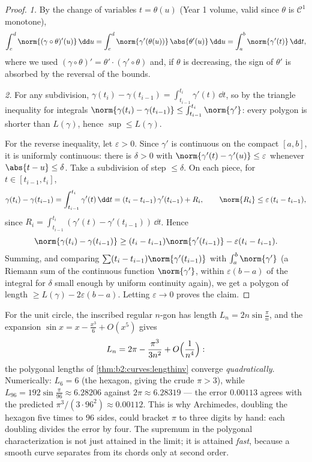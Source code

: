 \begin{proof}
\emph{1.} By the change of variables $t = \theta(u)$ (Year 1
volume, valid since $\theta$ is $\mathcal{C}^1$ monotone),
\[
\int_c^d \norm{(\gamma\circ\theta)'(u)}\,\dd u
= \int_c^d \norm{\gamma'(\theta(u))}\,\abs{\theta'(u)}\,\dd u
= \int_a^b \norm{\gamma'(t)}\,\dd t ,
\]
where we used $(\gamma\circ\theta)' = \theta'\cdot
(\gamma'\circ\theta)$ and, if $\theta$ is decreasing, the sign of
$\theta'$ is absorbed by the reversal of the bounds.

\emph{2.} For any subdivision, $\gamma(t_i) - \gamma(t_{i-1}) =
\int_{t_{i-1}}^{t_i}\gamma'(t)\,\dd t$, so by the triangle
inequality for integrals $\norm{\gamma(t_i) - \gamma(t_{i-1})}
\leq \int_{t_{i-1}}^{t_i}\norm{\gamma'}$: every polygon is shorter
than $L(\gamma)$, hence $\sup \leq L(\gamma)$.

For the reverse inequality, let $\varepsilon > 0$. Since $\gamma'$
is continuous on the compact $[a,b]$, it is uniformly continuous:
there is $\delta > 0$ with $\norm{\gamma'(t) - \gamma'(u)} \leq
\varepsilon$ whenever $\abs{t - u} \leq \delta$. Take a subdivision
of step $\leq \delta$. On each piece, for $t \in [t_{i-1}, t_i]$,
\[
\gamma(t_i) - \gamma(t_{i-1})
= \int_{t_{i-1}}^{t_i}\gamma'(t)\,\dd t
= (t_i - t_{i-1})\,\gamma'(t_{i-1}) + R_i,
\qquad
\norm{R_i} \leq \varepsilon\,(t_i - t_{i-1}),
\]
since $R_i = \int_{t_{i-1}}^{t_i}(\gamma'(t) -
\gamma'(t_{i-1}))\,\dd t$. Hence
\[
\norm{\gamma(t_i) - \gamma(t_{i-1})}
\geq (t_i - t_{i-1})\norm{\gamma'(t_{i-1})}
- \varepsilon (t_i - t_{i-1}) .
\]
Summing, and comparing $\sum (t_i -
t_{i-1})\norm{\gamma'(t_{i-1})}$ with $\int_a^b\norm{\gamma'}$ (a
Riemann sum of the continuous function $\norm{\gamma'}$, within
$\varepsilon(b - a)$ of the integral for $\delta$ small enough by
uniform continuity again), we get a polygon of length $\geq
L(\gamma) - 2\varepsilon(b - a)$. Letting $\varepsilon \to 0$
proves the claim.
\end{proof}

\begin{example}\label{ex:b2:curves:archimedes}
For the unit circle, the inscribed regular $n$-gon has length
$L_n = 2n\sin\frac\pi n$, and the expansion $\sin x = x -
\frac{x^3}6 + O(x^5)$ gives
\[
L_n = 2\pi - \frac{\pi^3}{3n^2} + O\Bigl(\frac1{n^4}\Bigr) :
\]
the polygonal lengths of \cref{thm:b2:curves:lengthinv}
converge \emph{quadratically}. Numerically: $L_6 = 6$
(the hexagon, giving the crude $\pi > 3$), while $L_{96} =
192\sin\frac{\pi}{96} \approx 6.28206$ against $2\pi \approx
6.28319$ --- the error $0.00113$ agrees with the predicted
$\pi^3/(3\cdot96^2) \approx 0.00112$. This is why Archimedes,
doubling the hexagon five times to $96$ sides, could bracket
$\pi$ to three digits by hand: each doubling divides the
error by four. The supremum in the polygonal
characterization is not just attained in the limit; it is
attained \emph{fast}, because a smooth curve separates from
its chords only at second order.
\end{example}

